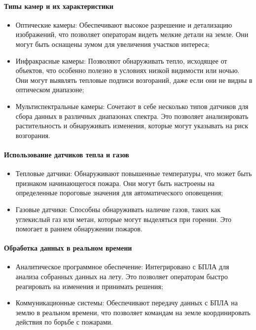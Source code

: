 \paragraph{Типы камер и их характеристики}
\begin{itemize}
	\item Оптические камеры: Обеспечивают высокое разрешение и детализацию изображений, что позволяет операторам видеть мелкие детали на земле. Они могут быть оснащены зумом для увеличения участков интереса;
	\item Инфракрасные камеры: Позволяют обнаруживать тепло, исходящее от объектов, что особенно полезно в условиях низкой видимости или ночью. Они могут выявлять тепловые подписи возгораний, даже если они не видны в оптическом диапазоне;
	\item Мультиспектральные камеры: Сочетают в себе несколько типов датчиков для сбора данных в различных диапазонах спектра. Это позволяет анализировать растительность и обнаруживать изменения, которые могут указывать на риск возгорания.
\end{itemize}
\paragraph{Использование датчиков тепла и газов}
\begin{itemize}
	\item Тепловые датчики: Обнаруживают повышенные температуры, что может быть признаком начинающегося пожара. Они могут быть настроены на определенные пороговые значения для автоматического оповещения;
	\item Газовые датчики: Способны обнаруживать наличие газов, таких как углекислый газ или метан, которые могут выделяться при горении. Это помогает в раннем обнаружении пожаров.
\end{itemize}
\paragraph{Обработка данных в реальном времени}
\begin{itemize}
	\item Аналитическое программное обеспечение: Интегрировано с БПЛА для анализа собранных данных на лету. Это позволяет операторам быстро реагировать на изменения и принимать решения;
	\item Коммуникационные системы: Обеспечивают передачу данных с БПЛА на землю в реальном времени, что позволяет командам на земле координировать действия по борьбе с пожарами.
\end{itemize}
